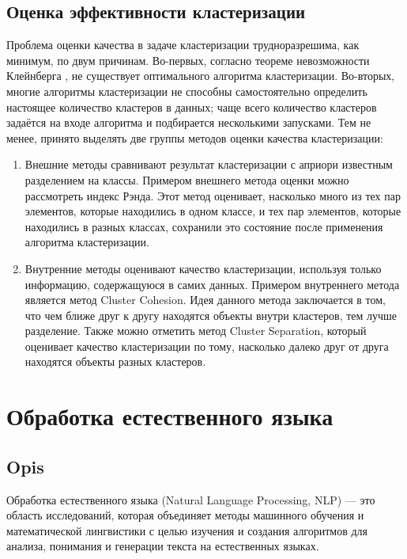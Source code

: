 	\subsection{Оценка эффективности кластеризации}
		Проблема оценки качества в задаче кластеризации трудноразрешима, как минимум, по двум причинам. Во-первых, согласно теореме невозможности Клейнберга \cite{Kleinberg}, не существует оптимального алгоритма кластеризации. Во-вторых, многие алгоритмы кластеризации не способны самостоятельно определить настоящее количество кластеров в данных; чаще всего количество кластеров задаётся на входе алгоритма и подбирается несколькими запусками.
		Тем не менее, принято выделять две группы методов оценки качества кластеризации:
		\begin{enumerate}
			\item Внешние методы сравнивают результат кластеризации с априори известным разделением на классы. Примером внешнего метода оценки можно рассмотреть индекс Рэнда. Этот метод оценивает, насколько много из тех пар элементов, которые находились в одном классе, и тех пар элементов, которые находились в разных классах, сохранили это состояние после применения алгоритма кластеризации.
			\item Внутренние методы оценивают качество кластеризации, используя только информацию, содержащуюся в самих данных. Примером внутреннего метода является метод Cluster Cohesion. Идея данного метода заключается в том, что чем ближе друг к другу находятся объекты внутри кластеров, тем лучше разделение. Также можно отметить метод Cluster Separation, который оценивает качество кластеризации по тому, насколько далеко друг от друга находятся объекты разных кластеров.
		\end{enumerate}


\section{Обработка естественного языка}

	\subsection{Opis}
		Обработка естественного языка (Natural Language Processing, NLP) — это область исследований, которая объединяет методы машинного обучения и математической лингвистики с целью изучения и создания алгоритмов для анализа, понимания и генерации текста на естественных языках.


